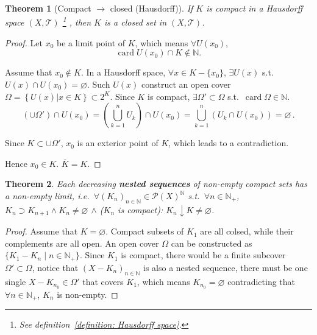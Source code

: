 \documentclass[openany]{book}
\theoremstyle{plain}
\newtheorem{theorem}{Theorem}[section] %
\theoremstyle{definition}
\DeclareMathOperator{\card}{card}
\begin{document}
\begin{theorem}[Compact $\to$ closed (Hausdorff)]\label{theorem: compact sets are closed in Hausdorff space}
	If $K$ is compact in a Hausdorff space $(X, \mathscr T)$%
		\footnote{See definition~\ref{definition: Hausdorff space}. }%
	, then $K$ is a closed set in $(X, \mathscr T)$.
\end{theorem}
\begin{proof}
	Let $x_0$ be a limit point of $K$, which means $\forall U(x_0)$, 
	\[
		\card U(x_0)\cap K \notin \mathbb{N}.
	\]

	Assume that $x_0 \notin K$. 
	In a Hausdorff space, $\forall x \in K - \{x_0\}$, $\exists U(x)$ s.t. $U(x)\cap U(x_0)=\varnothing$. 
	Such $U(x)$ construct an open cover $\varOmega=\left\{U(x)|x\in K \right\}\subset 2^K$. 
	Since $K$ is compact, $\exists \varOmega' \subset \varOmega$ s.t.\ $\card \Omega \in \mathbb{N}$. 
	\[
		\left(\cup\Omega'\right)
		\cap U(x_0)
		=
		\left(\bigcup_{k=1}^n{U_k}\right)
		\cap U(x_0)
		=
		\bigcup_{k=1}^n\left(
			U_k\cap U(x_0)
		\right)
		=
		\varnothing\,.
	\]

	Since $K\subset \cup \Omega'$, $x_0$ is an exterior point of $K$, which leads to a contradiction. 

	Hence $x_0 \in K$. $\overline K = K$.
\end{proof}

\begin{theorem}\label{theorem: compact nested sequences have non-empty limit}
	Each decreasing \emph{\textbf{nested sequences}} of non-empty compact sets has a non-empty limit, i.e.\ 
	$\forall (K_n)_{n \in \mathbb N} \in \mathscr P(X)^\mathbb N$ s.t.\ $\forall n \in \mathbb N_+$, $K_n \supset K_{n+1}\wedge K_n \neq \varnothing$ $\wedge$ ($K_n$ is compact): 
	$K_n \downarrow K \neq \varnothing$.
\end{theorem}
\begin{proof}
	Assume that $K = \varnothing$. 
	Compact subsets of $K_1$ are all colsed, while their complements are all open. An open cover $\varOmega$ can be constructed as $\{K_1 - K_n \mid n \in \mathbb N_+\}$. 
	Since $K_1$ is compact, there would be a finite subcover $\varOmega' \subset \varOmega$, notice that $(X - K_n)_{n \in \mathbb N}$ is also a nested sequence, there must be one single $X - K_{n_0} \in \varOmega'$ that covers $K_1$, which means $K_{n_0} = \varnothing$ contradicting that $\forall n \in \mathbb N_+$, $K_n$ is non-empty.
\end{proof}
\end{document}
